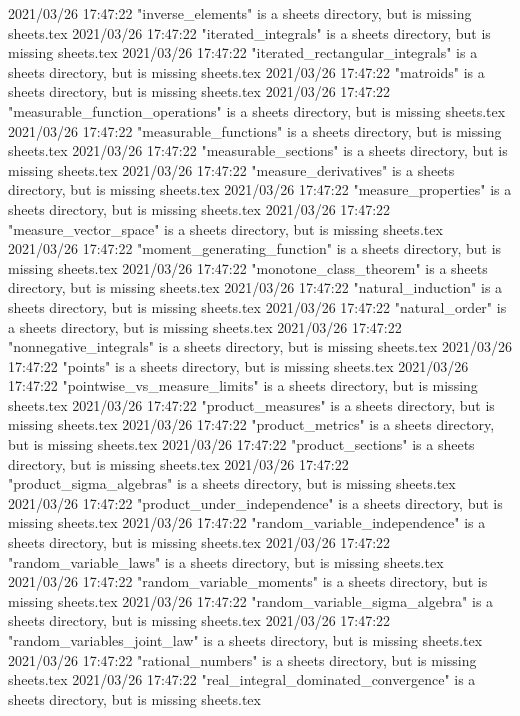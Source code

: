 2021/03/26 17:47:22 "inverse_elements" is a sheets directory, but is missing sheets.tex
2021/03/26 17:47:22 "iterated_integrals" is a sheets directory, but is missing sheets.tex
2021/03/26 17:47:22 "iterated_rectangular_integrals" is a sheets directory, but is missing sheets.tex
2021/03/26 17:47:22 "matroids" is a sheets directory, but is missing sheets.tex
2021/03/26 17:47:22 "measurable_function_operations" is a sheets directory, but is missing sheets.tex
2021/03/26 17:47:22 "measurable_functions" is a sheets directory, but is missing sheets.tex
2021/03/26 17:47:22 "measurable_sections" is a sheets directory, but is missing sheets.tex
2021/03/26 17:47:22 "measure_derivatives" is a sheets directory, but is missing sheets.tex
2021/03/26 17:47:22 "measure_properties" is a sheets directory, but is missing sheets.tex
2021/03/26 17:47:22 "measure_vector_space" is a sheets directory, but is missing sheets.tex
2021/03/26 17:47:22 "moment_generating_function" is a sheets directory, but is missing sheets.tex
2021/03/26 17:47:22 "monotone_class_theorem" is a sheets directory, but is missing sheets.tex
2021/03/26 17:47:22 "natural_induction" is a sheets directory, but is missing sheets.tex
2021/03/26 17:47:22 "natural_order" is a sheets directory, but is missing sheets.tex
2021/03/26 17:47:22 "nonnegative_integrals" is a sheets directory, but is missing sheets.tex
2021/03/26 17:47:22 "points" is a sheets directory, but is missing sheets.tex
2021/03/26 17:47:22 "pointwise_vs_measure_limits" is a sheets directory, but is missing sheets.tex
2021/03/26 17:47:22 "product_measures" is a sheets directory, but is missing sheets.tex
2021/03/26 17:47:22 "product_metrics" is a sheets directory, but is missing sheets.tex
2021/03/26 17:47:22 "product_sections" is a sheets directory, but is missing sheets.tex
2021/03/26 17:47:22 "product_sigma_algebras" is a sheets directory, but is missing sheets.tex
2021/03/26 17:47:22 "product_under_independence" is a sheets directory, but is missing sheets.tex
2021/03/26 17:47:22 "random_variable_independence" is a sheets directory, but is missing sheets.tex
2021/03/26 17:47:22 "random_variable_laws" is a sheets directory, but is missing sheets.tex
2021/03/26 17:47:22 "random_variable_moments" is a sheets directory, but is missing sheets.tex
2021/03/26 17:47:22 "random_variable_sigma_algebra" is a sheets directory, but is missing sheets.tex
2021/03/26 17:47:22 "random_variables_joint_law" is a sheets directory, but is missing sheets.tex
2021/03/26 17:47:22 "rational_numbers" is a sheets directory, but is missing sheets.tex
2021/03/26 17:47:22 "real_integral_dominated_convergence" is a sheets directory, but is missing sheets.tex

